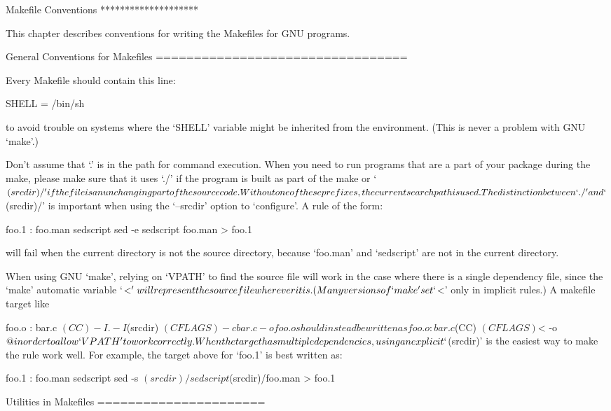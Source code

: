 Makefile Conventions
********************

   This chapter describes conventions for writing the Makefiles for GNU
programs.

General Conventions for Makefiles
=================================

   Every Makefile should contain this line:

     SHELL = /bin/sh

to avoid trouble on systems where the `SHELL' variable might be
inherited from the environment.  (This is never a problem with GNU
`make'.)

   Don't assume that `.' is in the path for command execution.  When
you need to run programs that are a part of your package during the
make, please make sure that it uses `./' if the program is built as
part of the make or `$(srcdir)/' if the file is an unchanging part of
the source code.  Without one of these prefixes, the current search
path is used.

   The distinction between `./' and `$(srcdir)/' is important when
using the `--srcdir' option to `configure'.  A rule of the form:

     foo.1 : foo.man sedscript
             sed -e sedscript foo.man > foo.1

will fail when the current directory is not the source directory,
because `foo.man' and `sedscript' are not in the current directory.

   When using GNU `make', relying on `VPATH' to find the source file
will work in the case where there is a single dependency file, since
the `make' automatic variable `$<' will represent the source file
wherever it is.  (Many versions of `make' set `$<' only in implicit
rules.)  A makefile target like

     foo.o : bar.c
             $(CC) -I. -I$(srcdir) $(CFLAGS) -c bar.c -o foo.o

should instead be written as

     foo.o : bar.c
             $(CC) $(CFLAGS) $< -o $@

in order to allow `VPATH' to work correctly.  When the target has
multiple dependencies, using an explicit `$(srcdir)' is the easiest way
to make the rule work well.  For example, the target above for `foo.1'
is best written as:

     foo.1 : foo.man sedscript
             sed -s $(srcdir)/sedscript $(srcdir)/foo.man > foo.1

Utilities in Makefiles
======================

